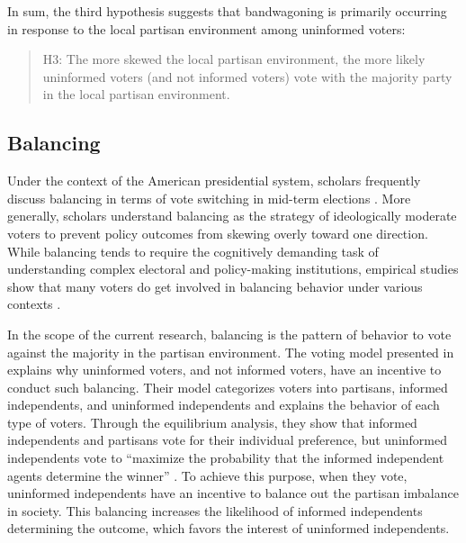 \documentclass[letterpaper, 12pt]{article}
\begin{document}
    \par In sum, the third hypothesis suggests that bandwagoning is primarily occurring in response to the local partisan environment among uninformed voters:

    \begin{verse}
        H3: The more skewed the local partisan environment, the more likely uninformed voters (and not informed voters) vote with the majority party in the local partisan environment. 
    \end{verse}

    \subsection*{Balancing}

    \par Under the context of the American presidential system, scholars frequently discuss balancing in terms of vote switching in mid-term elections \citep{Alesina1995papo}. More generally, scholars understand balancing as the strategy of ideologically moderate voters to prevent policy outcomes from skewing overly toward one direction. While balancing tends to require the cognitively demanding task of understanding complex electoral and policy-making institutions, empirical studies show that many voters do get involved in balancing behavior under various contexts \citep{Kedar2005whmo, Kedar2006hovo, Folke2012gumi}.  
    
    \par In the scope of the current research, balancing is the pattern of behavior to vote against the majority in the partisan environment. The voting model presented in \cite{Feddersen1996thsw} explains why uninformed voters, and not informed voters, have an incentive to conduct such balancing. Their model categorizes voters into partisans, informed independents, and uninformed independents and explains the behavior of each type of voters. Through the equilibrium analysis, they show that informed independents and partisans vote for their individual preference, but uninformed independents vote to ``maximize the probability that the informed independent agents determine the winner'' \citep[][p.414]{Feddersen1996thsw}. To achieve this purpose, when they vote, uninformed independents have an incentive to balance out the partisan imbalance in society. This balancing increases the likelihood of informed independents determining the outcome, which favors the interest of uninformed independents. 
\end{document}
